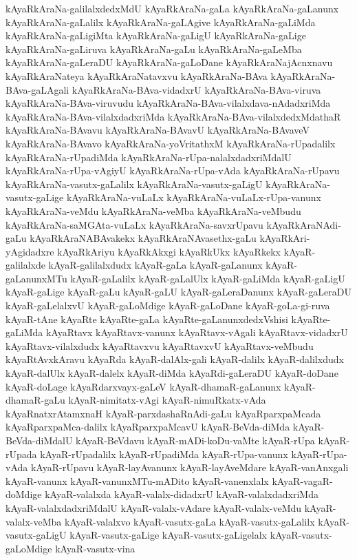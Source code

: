 {kAyaRkAraNa-galilalxdedxMdU
kAyaRkAraNa-gaLa
kAyaRkAraNa-gaLanunx
kAyaRkAraNa-gaLalilx
kAyaRkAraNa-gaLAgive
kAyaRkAraNa-gaLiMda
kAyaRkAraNa-gaLigiMta
kAyaRkAraNa-gaLigU
kAyaRkAraNa-gaLige
kAyaRkAraNa-gaLiruva
kAyaRkAraNa-gaLu
kAyaRkAraNa-gaLeMba
kAyaRkAraNa-gaLeraDU
kAyaRkAraNa-gaLoDane
kAyaRkAraNajAcnxnavu
kAyaRkAraNateya
kAyaRkAraNatavxvu
kAyaRkAraNa-BAva
kAyaRkAraNa-BAva-gaLAgali
kAyaRkAraNa-BAva-vidadxrU
kAyaRkAraNa-BAva-viruva
kAyaRkAraNa-BAva-viruvudu
kAyaRkAraNa-BAva-vilalxdava-nAdadxriMda
kAyaRkAraNa-BAva-vilalxdadxriMda
kAyaRkAraNa-BAva-vilalxdedxMdathaR
kAyaRkAraNa-BAvavu
kAyaRkAraNa-BAvavU
kAyaRkAraNa-BAvaveV
kAyaRkAraNa-BAvavo
kAyaRkAraNa-yoVritathxM
kAyaRkAraNa-rUpadalilx
kAyaRkAraNa-rUpadiMda
kAyaRkAraNa-rUpa-nalalxdadxriMdalU
kAyaRkAraNa-rUpa-vAgiyU
kAyaRkAraNa-rUpa-vAda
kAyaRkAraNa-rUpavu
kAyaRkAraNa-vasutx-gaLalilx
kAyaRkAraNa-vasutx-gaLigU
kAyaRkAraNa-vasutx-gaLige
kAyaRkAraNa-vuLaLx
kAyaRkAraNa-vuLaLx-rUpa-vanunx
kAyaRkAraNa-veMdu
kAyaRkAraNa-veMba
kAyaRkAraNa-veMbudu
kAyaRkAraNa-saMGAta-vuLaLx
kAyaRkAraNa-savxrUpavu
kAyaRkAraNAdi-gaLu
kAyaRkAraNABAvakekx
kAyaRkAraNAvasethx-gaLu
kAyaRkAri-yAgidadxre
kAyaRkAriyu
kAyaRkAkxgi
kAyaRkUkx
kAyaRkekx
kAyaR-galilalxde
kAyaR-galilalxdudx
kAyaR-gaLa
kAyaR-gaLanunx
kAyaR-gaLanunxMTu
kAyaR-gaLalilx
kAyaR-gaLalUlx
kAyaR-gaLiMda
kAyaR-gaLigU
kAyaR-gaLige
kAyaR-gaLu
kAyaR-gaLU
kAyaR-gaLeraDanunx
kAyaR-gaLeraDU
kAyaR-gaLelalxvU
kAyaR-gaLoMdige
kAyaR-gaLoDane
kAyaR-goLa-gi-ruva
kAyaR-tAne
kAyaRte
kAyaRte-gaLa
kAyaRte-gaLanunxdedxVshisi
kAyaRte-gaLiMda
kAyaRtavx
kAyaRtavx-vanunx
kAyaRtavx-vAgali
kAyaRtavx-vidadxrU
kAyaRtavx-vilalxdudx
kAyaRtavxvu
kAyaRtavxvU
kAyaRtavx-veMbudu
kAyaRtAvxkAravu
kAyaRda
kAyaR-dalAlx-gali
kAyaR-dalilx
kAyaR-dalilxdudx
kAyaR-dalUlx
kAyaR-dalelx
kAyaR-diMda
kAyaRdi-gaLeraDU
kAyaR-doDane
kAyaR-doLage
kAyaRdarxvayx-gaLeV
kAyaR-dhamaR-gaLanunx
kAyaR-dhamaR-gaLu
kAyaR-nimitatx-vAgi
kAyaR-nimuRkatx-vAda
kAyaRnatxrAtamxnaH
kAyaR-parxdashaRnAdi-gaLu
kAyaRparxpaMcada
kAyaRparxpaMca-dalilx
kAyaRparxpaMcavU
kAyaR-BeVda-diMda
kAyaR-BeVda-diMdalU
kAyaR-BeVdavu
kAyaR-mADi-koDu-vaMte
kAyaR-rUpa
kAyaR-rUpada
kAyaR-rUpadalilx
kAyaR-rUpadiMda
kAyaR-rUpa-vanunx
kAyaR-rUpa-vAda
kAyaR-rUpavu
kAyaR-layAvanunx
kAyaR-layAveMdare
kAyaR-vanAnxgali
kAyaR-vanunx
kAyaR-vanunxMTu-mADito
kAyaR-vanenxlalx
kAyaR-vagaR-doMdige
kAyaR-valalxda
kAyaR-valalx-didadxrU
kAyaR-valalxdadxriMda
kAyaR-valalxdadxriMdalU
kAyaR-valalx-vAdare
kAyaR-valalx-veMdu
kAyaR-valalx-veMba
kAyaR-valalxvo
kAyaR-vasutx-gaLa
kAyaR-vasutx-gaLalilx
kAyaR-vasutx-gaLigU
kAyaR-vasutx-gaLige
kAyaR-vasutx-gaLigelalx
kAyaR-vasutx-gaLoMdige
kAyaR-vasutx-vina
}
